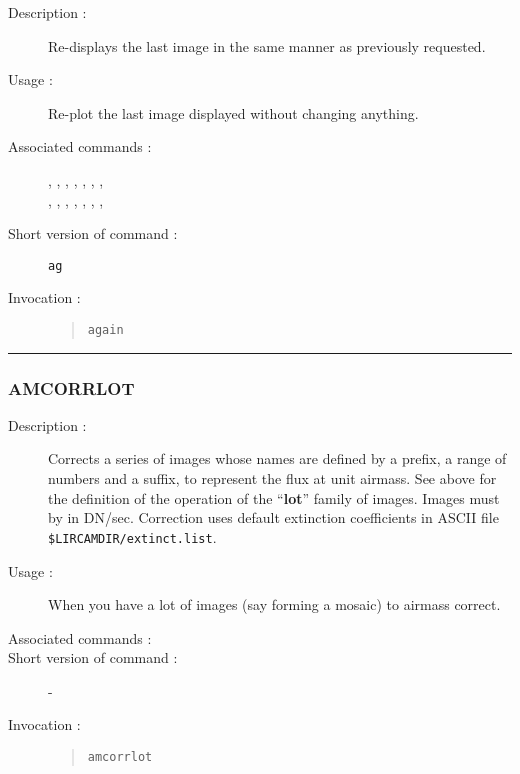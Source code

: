 \begin{description}

\item[Description :] Re-displays the last image in the same manner as
previously requested.

\item[Usage :] Re-plot the last image displayed without changing anything. 

\item[Associated commands :] {\tt {}}, 
{\tt {}}, {\tt {}}, 
{\tt {}}, {\tt {}}, 
{\tt {}}, {\tt {}}, \\ 
{\tt {}}, {\tt {}}, 
{\tt {}}, {\tt {}}, 
{\tt {}}, {\tt {}}, 
{\tt {}}, {\tt {}}

\item[Short version of command :] {\tt ag}
\item[Invocation :]

\begin{quote}{\tt again }\end{quote}

\end{description}

\hrule 
\subsubsection*{\label{AMCORRLOT}AMCORRLOT}

\begin{description}

\item[Description :] Corrects a series of images whose names are defined
by a prefix, a range of numbers and a suffix, to represent the flux at
unit airmass.  See above for the definition of the operation of the
``{\bf lot}'' family of images. Images must by in DN/sec.  Correction uses
default extinction coefficients in ASCII file {\tt \$LIRCAMDIR/extinct.list}. 

\item[Usage :] When you have a lot of images (say forming a mosaic) to
airmass correct.

\item[Associated commands :] {\tt {}}
\item[Short version of command :] -
\item[Invocation :]

\begin{quote}{\tt  amcorrlot }\end{quote}

\end{description}

